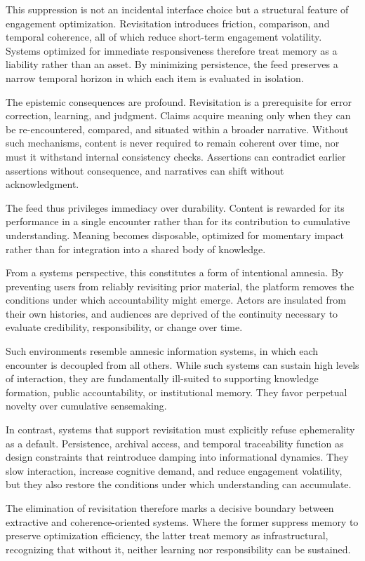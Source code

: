 \documentclass[12pt]{article}
\begin{document}
This suppression is not an incidental interface choice but a structural feature of engagement optimization. Revisitation introduces friction, comparison, and temporal coherence, all of which reduce short-term engagement volatility. Systems optimized for immediate responsiveness therefore treat memory as a liability rather than an asset. By minimizing persistence, the feed preserves a narrow temporal horizon in which each item is evaluated in isolation.

The epistemic consequences are profound. Revisitation is a prerequisite for error correction, learning, and judgment. Claims acquire meaning only when they can be re-encountered, compared, and situated within a broader narrative. Without such mechanisms, content is never required to remain coherent over time, nor must it withstand internal consistency checks. Assertions can contradict earlier assertions without consequence, and narratives can shift without acknowledgment.

The feed thus privileges immediacy over durability. Content is rewarded for its performance in a single encounter rather than for its contribution to cumulative understanding. Meaning becomes disposable, optimized for momentary impact rather than for integration into a shared body of knowledge.

From a systems perspective, this constitutes a form of intentional amnesia. By preventing users from reliably revisiting prior material, the platform removes the conditions under which accountability might emerge. Actors are insulated from their own histories, and audiences are deprived of the continuity necessary to evaluate credibility, responsibility, or change over time.

Such environments resemble amnesic information systems, in which each encounter is decoupled from all others. While such systems can sustain high levels of interaction, they are fundamentally ill-suited to supporting knowledge formation, public accountability, or institutional memory. They favor perpetual novelty over cumulative sensemaking.

In contrast, systems that support revisitation must explicitly refuse ephemerality as a default. Persistence, archival access, and temporal traceability function as design constraints that reintroduce damping into informational dynamics. They slow interaction, increase cognitive demand, and reduce engagement volatility, but they also restore the conditions under which understanding can accumulate.

The elimination of revisitation therefore marks a decisive boundary between extractive and coherence-oriented systems. Where the former suppress memory to preserve optimization efficiency, the latter treat memory as infrastructural, recognizing that without it, neither learning nor responsibility can be sustained.
\end{document}
